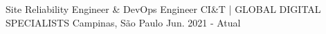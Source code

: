 

\begin{cventries}

  \cventry
    {Site Reliability Engineer \& DevOps Engineer} %
    {CI&T | GLOBAL DIGITAL SPECIALISTS} %
    {Campinas, São Paulo} %
    {Jun. 2021 - Atual} %
    {
      \begin{cvitems} %
      \end{cvitems}
    }


\end{cventries}
